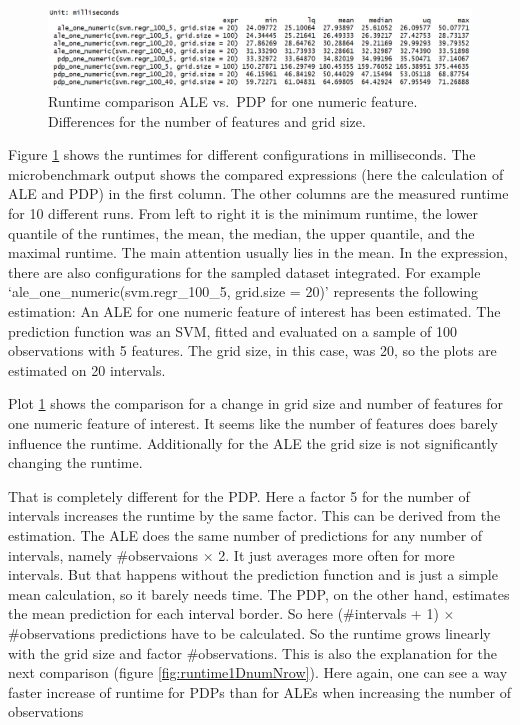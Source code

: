 \documentclass[
]{krantz}
\begin{document}
\begin{figure}
\includegraphics[width=1\linewidth]{images/ale_1_one_numeric_cols_and_gridsize} \caption{Runtime comparison ALE vs.~PDP for one numeric feature. Differences for the number of features and grid size.}\label{fig:runtime1DnumColAndSize}
\end{figure}



Figure \ref{fig:runtime1DnumColAndSize} shows the runtimes for different configurations in milliseconds. The microbenchmark output shows the compared expressions (here the calculation of ALE and PDP) in the first column. The other columns are the measured runtime for 10 different runs. From left to right it is the minimum runtime, the lower quantile of the runtimes, the mean, the median, the upper quantile, and the maximal runtime. The main attention usually lies in the mean. In the expression, there are also configurations for the sampled dataset integrated. For example `ale\_one\_numeric(svm.regr\_100\_5, grid.size = 20)' represents the following estimation: An ALE for one numeric feature of interest has been estimated. The prediction function was an SVM, fitted and evaluated on a sample of 100 observations with 5 features. The grid size, in this case, was 20, so the plots are estimated on 20 intervals.

Plot \ref{fig:runtime1DnumColAndSize} shows the comparison for a change in grid size and number of features for one numeric feature of interest. It seems like the number of features does barely influence the runtime. Additionally for the ALE the grid size is not significantly changing the runtime.

That is completely different for the PDP. Here a factor 5 for the number of intervals increases the runtime by the same factor. This can be derived from the estimation. The ALE does the same number of predictions for any number of intervals, namely \#observaions \(\times\) 2. It just averages more often for more intervals. But that happens without the prediction function and is just a simple mean calculation, so it barely needs time. The PDP, on the other hand, estimates the mean prediction for each interval border. So here (\#intervals + 1) \(\times\) \#observations predictions have to be calculated. So the runtime grows linearly with the grid size and factor \#observations. This is also the explanation for the next comparison (figure \ref{fig:runtime1DnumNrow}). Here again, one can see a way faster increase of runtime for PDPs than for ALEs when increasing the number of observations
\end{document}
